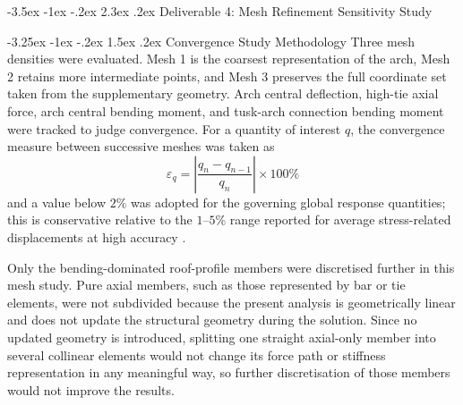 \documentclass[10pt,a4paper]{article}
\makeatletter
\renewcommand\section{\@startsection{section}{1}{\z@}
  {-3.5ex \@plus -1ex \@minus -.2ex}
  {2.3ex \@plus .2ex}
  {\normalfont\Large}}
\renewcommand\subsection{\@startsection{subsection}{2}{\z@}
  {-3.25ex \@plus -1ex \@minus -.2ex}
  {1.5ex \@plus .2ex}
  {\normalfont\large}}
\makeatother
\begin{document}
\newpage
\section{Deliverable 4: Mesh Refinement Sensitivity Study}

\subsection{Convergence Study Methodology}
Three mesh densities were evaluated. Mesh 1 is the coarsest representation of the arch, Mesh 2 retains more intermediate points, and Mesh 3 preserves the full coordinate set taken from the supplementary geometry. Arch central deflection, high-tie axial force, arch central bending moment, and tusk-arch connection bending moment were tracked to judge convergence. For a quantity of interest $q$, the convergence measure between successive meshes was taken as
\[
\varepsilon_q = \left|\frac{q_n - q_{n-1}}{q_n}\right| \times 100\%
\]
and a value below \(2\%\) was adopted for the governing global response quantities; this is conservative relative to the \(1\text{--}5\%\) range reported for average stress-related displacements at high accuracy \cite{ansys_adaptive_convergence}.

Only the bending-dominated roof-profile members were discretised further in this mesh study. Pure axial members, such as those represented by bar or tie elements, were not subdivided because the present analysis is geometrically linear and does not update the structural geometry during the solution. Since no updated geometry is introduced, splitting one straight axial-only member into several collinear elements would not change its force path or stiffness representation in any meaningful way, so further discretisation of those members would not improve the results.
\end{document}
